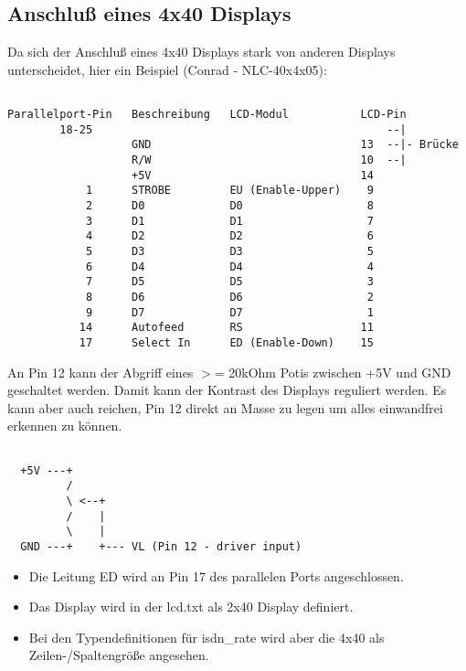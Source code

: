 \subsection{Anschluß eines 4x40 Displays}

  Da sich der Anschluß eines 4x40 Displays stark von anderen Displays
  unterscheidet, hier ein Beispiel (Conrad - NLC-40x4x05):

\begin{example}
\begin{verbatim}

Parallelport-Pin   Beschreibung   LCD-Modul           LCD-Pin
        18-25                                             --|
                   GND                                13  --|- Brücke
                   R/W                                10  --|
                   +5V                                14
            1      STROBE         EU (Enable-Upper)    9
            2      D0             D0                   8
            3      D1             D1                   7
            4      D2             D2                   6
            5      D3             D3                   5
            6      D4             D4                   4
            7      D5             D5                   3
            8      D6             D6                   2
            9      D7             D7                   1
           14      Autofeed       RS                  11
           17      Select In      ED (Enable-Down)    15
\end{verbatim}
\end{example}


  An Pin 12 kann der Abgriff eines $>$= 20kOhm Potis zwischen +5V und GND 
  geschaltet werden. Damit kann der Kontrast des Displays reguliert werden.
  Es kann aber auch reichen, Pin 12 direkt an Masse zu legen um alles
  einwandfrei erkennen zu können.

\begin{example}
\begin{verbatim}

  +5V ---+
         /
         \ <--+
         /    |
         \    |
  GND ---+    +--- VL (Pin 12 - driver input)
\end{verbatim}
\end{example}


  \begin{itemize}
  \item Die Leitung ED wird an Pin 17 des parallelen Ports angeschlossen.
  
  \item Das Display wird in der lcd.txt als 2x40 Display definiert.
  
  \item Bei den Typendefinitionen für isdn\_rate wird aber die 4x40 als
    Zeilen-/Spaltengröße angesehen.
  \end{itemize}


